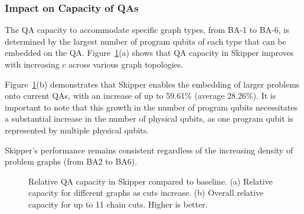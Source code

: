 \subsubsection{Impact on Capacity of QAs}

The QA capacity to accommodate specific graph types, from BA-1 to BA-6, is determined by the largest number of program qubits of each type that can be embedded on the QA.
Figure~\ref{fig:future_relative_capacity}(a) shows that QA capacity in Skipper improves with increasing $c$ across various graph topologies.


Figure~\ref{fig:future_relative_capacity}(b) demonstrates that Skipper enables the embedding of larger problems onto current QAs, with an increase of up to 59.61\% (average 28.26\%). 
It is important to note that this growth in the number of program qubits necessitates a substantial increase in the number of physical qubits, as one program qubit is represented by multiple physical qubits. 


\begin{tcolorbox}[colback=blue!12]
	Skipper's performance remains consistent regardless of the increasing density of problem graphs (from BA2 to BA6). 
\end{tcolorbox}



\begin{figure}[]
    \captionsetup[subfigure]{position=top} %
    \centering
    \caption{        
        Relative QA capacity in Skipper compared to baseline. 
         (a) Relative capacity for different graphs as cuts increase. 
         (b) Overall relative capacity for up to 11 chain cuts.
         Higher is better.
    }    
    \label{fig:future_relative_capacity} 
\end{figure}  



